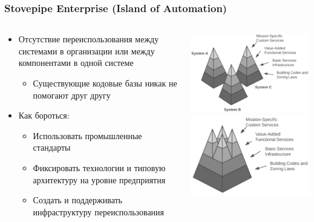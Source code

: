 \documentclass[xetex,mathserif,serif]{beamer}
\begin{document}
	\begin{frame}
		\frametitle{Stovepipe Enterprise (Island of Automation)}
		\begin{columns}
			\begin{column}{0.6\textwidth}
				\begin{itemize}
					\item Отсутствие переиспользования между системами в организации или между компонентами в одной системе
					\begin{itemize}
						\item Существующие кодовые базы никак не помогают друг другу
					\end{itemize}
					\item Как бороться:
					\begin{itemize}
						\item Использовать промышленные стандарты
						\item Фиксировать технологии и типовую архитектуру на уровне предприятия
						\item Создать и поддерживать инфраструктуру переиспользования
					\end{itemize}
				\end{itemize}
			\end{column}
			\begin{column}{0.4\textwidth}
				\begin{center}
					\includegraphics[width=\textwidth]{islandOfAutomation.png} \\
					\includegraphics[width=\textwidth]{noIslandOfAutomation.png}

\end{center}
\end{column}
\end{columns}
\end{frame}
\end{document}

